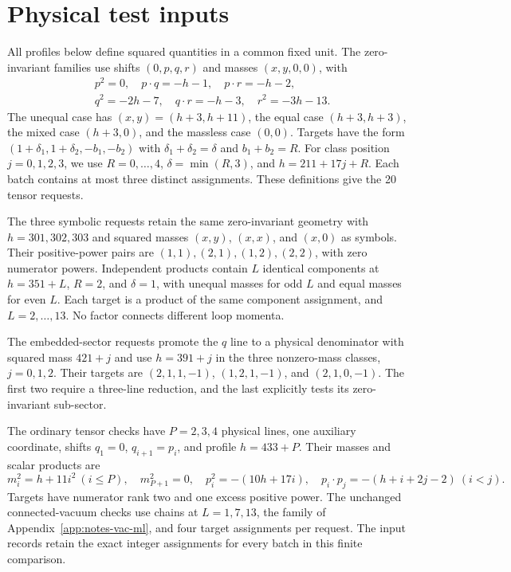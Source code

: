\documentclass[11pt,a4paper]{article}
\begin{document}
\section{Physical test inputs}
\label{notes-light-app:families-new}
All profiles below define squared quantities in a common fixed unit. The zero-invariant families use shifts $(0,p,q,r)$ and masses $(x,y,0,0)$, with
\begin{align}
 &p^2=0,\quad p\cdot q=-h-1,\quad p\cdot r=-h-2,\nonumber\\
 &q^2=-2h-7,\quad q\cdot r=-h-3,\quad r^2=-3h-13.
 \label{notes-light-eq:light-input}
\end{align}
The unequal case has $(x,y)=(h+3,h+11)$, the equal case $(h+3,h+3)$, the mixed case $(h+3,0)$, and the massless case $(0,0)$. Targets have the form $(1+\delta_1,1+\delta_2,-b_1,-b_2)$ with $\delta_1+\delta_2=\delta$ and $b_1+b_2=R$. For class position $j=0,1,2,3$, we use $R=0,\ldots,4$, $\delta=\min(R,3)$, and $h=211+17j+R$. Each batch contains at most three distinct assignments. These definitions give the 20 tensor requests.

The three symbolic requests retain the same zero-invariant geometry with $h=301,302,303$ and squared masses $(x,y)$, $(x,x)$, and $(x,0)$ as symbols. Their positive-power pairs are $(1,1),(2,1),(1,2),(2,2)$, with zero numerator powers. Independent products contain $L$ identical components at $h=351+L$, $R=2$, and $\delta=1$, with unequal masses for odd $L$ and equal masses for even $L$. Each target is a product of the same component assignment, and $L=2,\ldots,13$. No factor connects different loop momenta.

The embedded-sector requests promote the $q$ line to a physical denominator with squared mass $421+j$ and use $h=391+j$ in the three nonzero-mass classes, $j=0,1,2$. Their targets are $(2,1,1,-1)$, $(1,2,1,-1)$, and $(2,1,0,-1)$. The first two require a three-line reduction, and the last explicitly tests its zero-invariant sub-sector.

The ordinary tensor checks have $P=2,3,4$ physical lines, one auxiliary coordinate, shifts $q_1=0$, $q_{i+1}=p_i$, and profile $h=433+P$. Their masses and scalar products are
\begin{equation}
 m_i^2=h+11i^2\ (i\leq P),\quad m_{P+1}^2=0,\quad
 p_i^2=-(10h+17i),\quad p_i\cdot p_j=-(h+i+2j-2)\ (i<j).
 \label{notes-light-eq:ordinary-input}
\end{equation}
Targets have numerator rank two and one excess positive power. The unchanged connected-vacuum checks use chains at $L=1,7,13$, the family of Appendix~\ref{app:notes-vac-ml}, and four target assignments per request. The input records retain the exact integer assignments for every batch in this finite comparison.
\end{document}
